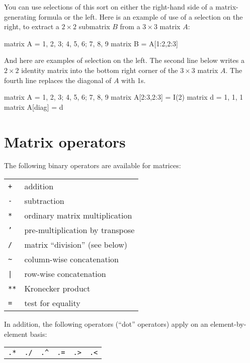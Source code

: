 You can use selections of this sort on either the right-hand side of
a matrix-generating formula or the left.  Here is an example of use of
a selection on the right, to extract a $2\times 2$ submatrix $B$ from a
$3\times 3$ matrix $A$:
%
\begin{code}
matrix A = { 1, 2, 3; 4, 5, 6; 7, 8, 9 }
matrix B = A[1:2,2:3]
\end{code}
%
And here are examples of selection on the left.  The second line below
writes a $2\times 2$ identity matrix into the bottom right corner of the
$3\times 3$ matrix $A$.  The fourth line replaces the diagonal of $A$ 
with 1s.
%
\begin{code}
matrix A = { 1, 2, 3; 4, 5, 6; 7, 8, 9 }
matrix A[2:3,2:3] = I(2)
matrix d = { 1, 1, 1 }
matrix A[diag] = d
\end{code}

\section{Matrix operators}
\label{matrix-op}

The following binary operators are available for matrices:

\begin{center}
\begin{tabular}{ll}
\texttt{+}  & addition \\
\texttt{-}  & subtraction \\
\texttt{*}  & ordinary matrix multiplication \\
\texttt{'}  & pre-multiplication by transpose \\
\texttt{/}  & matrix ``division'' (see below) \\
\verb+~+    & column-wise concatenation \\
\verb+|+    & row-wise concatenation \\
\texttt{**} & Kronecker product \\
\texttt{=}  & test for equality 
\end{tabular}
\end{center}

In addition, the following operators (``dot'' operators) apply on an
element-by-element basis:

\begin{center}
\begin{tabular}{cccccc}
\texttt{.*}  &  \texttt{./}  &  \verb+.^+  &
\texttt{.=}  &  \texttt{.>}  &  \texttt{.<} 
\end{tabular}
\end{center}

